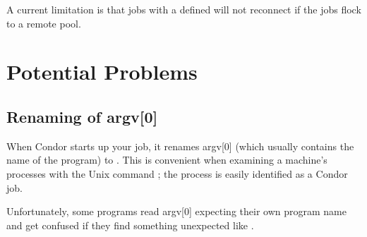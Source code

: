 A current limitation
is that jobs with a defined  will not
reconnect if the jobs flock to a remote pool.


\section{Potential Problems}

\subsection{Renaming of argv[0]}

When Condor starts up your job, it renames argv[0] (which usually
contains the name of the program) to .
This is
convenient when examining a machine's processes with the Unix
command ; the process
is easily identified as a Condor job.  

Unfortunately, some programs read argv[0] expecting their own program
name and get confused if they find something unexpected like
.

